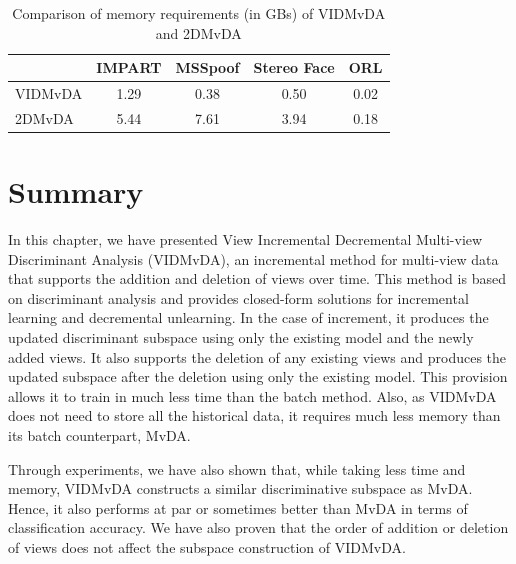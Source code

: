 \begin{table}[t]
	\centering
	\caption{Comparison of memory requirements (in GBs) of VIDMvDA and 2DMvDA}
	\label{tab:VIDMvDA_Res_Mem_2D}
	\begin{tabular}{l c c c c} \toprule
		
		 & \textbf{IMPART} & \textbf{MSSpoof} & \textbf{Stereo Face} & \textbf{ORL} \\ \midrule
		VIDMvDA & 1.29 & 0.38 & 0.50 & 0.02 \\ 
		2DMvDA    & 5.44 & 7.61 & 3.94 & 0.18 \\ \bottomrule
	
	\end{tabular}
\end{table}









\section{Summary}
\label{sec:VIDMvDA_conc}
In this chapter, we have presented View Incremental Decremental Multi-view Discriminant Analysis (VIDMvDA), an incremental method for multi-view data that supports the addition and deletion of views over time. This method is based on discriminant analysis and provides closed-form solutions for incremental learning and decremental unlearning. In the case of increment, it produces the updated discriminant subspace using only the existing model and the newly added views. It also supports the deletion of any existing views and produces the updated subspace after the deletion using only the existing model. This provision allows it to train in much less time than the batch method. Also, as VIDMvDA does not need to store all the historical data, it requires much less memory than its batch counterpart, MvDA.

Through experiments, we have also shown that, while taking less time and memory, VIDMvDA constructs a similar discriminative subspace as MvDA. Hence, it also performs at par or sometimes better than MvDA in terms of classification accuracy. We have also proven that the order of addition or deletion of views does not affect the subspace construction of VIDMvDA.


\chapterend
\cleardoublepage